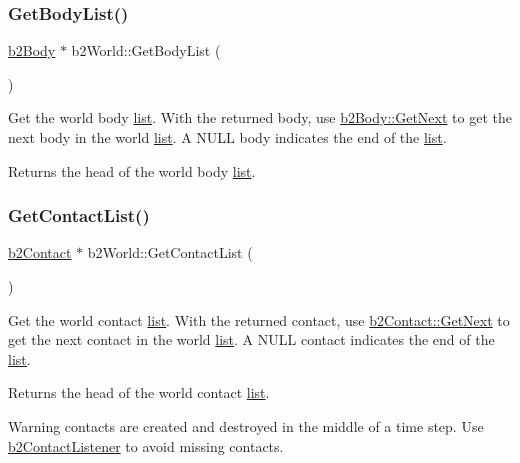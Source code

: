 \subsubsection{\texorpdfstring{Get\+Body\+List()}{GetBodyList()}\hspace{0.1cm}{\footnotesize\ttfamily [2/2]}}
{\footnotesize\ttfamily \hyperlink{classb2Body}{b2\+Body} $\ast$ b2\+World\+::\+Get\+Body\+List (\begin{DoxyParamCaption}{ }\end{DoxyParamCaption})\hspace{0.3cm}{\ttfamily [inline]}}

Get the world body \hyperlink{protocollist-p}{list}. With the returned body, use \hyperlink{classb2Body_ad54182a11d02362b027a0eb072775bdc}{b2\+Body\+::\+Get\+Next} to get the next body in the world \hyperlink{protocollist-p}{list}. A N\+U\+LL body indicates the end of the \hyperlink{protocollist-p}{list}. \begin{DoxyReturn}{Returns}
the head of the world body \hyperlink{protocollist-p}{list}. 
\end{DoxyReturn}
\mbox{\label{classb2World_ab1e1c59fd7534c0268c2a3e31370a425}} 
\subsubsection{\texorpdfstring{Get\+Contact\+List()}{GetContactList()}\hspace{0.1cm}{\footnotesize\ttfamily [1/2]}}
{\footnotesize\ttfamily \hyperlink{classb2Contact}{b2\+Contact} $\ast$ b2\+World\+::\+Get\+Contact\+List (\begin{DoxyParamCaption}{ }\end{DoxyParamCaption})\hspace{0.3cm}{\ttfamily [inline]}}

Get the world contact \hyperlink{protocollist-p}{list}. With the returned contact, use \hyperlink{classb2Contact_aebfebb1e4b27dc0bd7aa120093e3d650}{b2\+Contact\+::\+Get\+Next} to get the next contact in the world \hyperlink{protocollist-p}{list}. A N\+U\+LL contact indicates the end of the \hyperlink{protocollist-p}{list}. \begin{DoxyReturn}{Returns}
the head of the world contact \hyperlink{protocollist-p}{list}. 
\end{DoxyReturn}
\begin{DoxyWarning}{Warning}
contacts are created and destroyed in the middle of a time step. Use \hyperlink{classb2ContactListener}{b2\+Contact\+Listener} to avoid missing contacts. 
\end{DoxyWarning}
\mbox{\label{classb2World_a92610ce7858e90d685de968584b6afcb}} 
